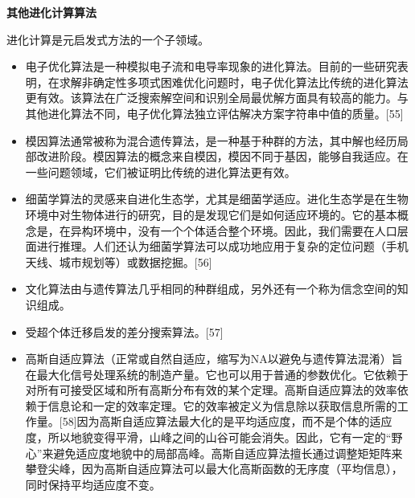 \textbf{其他进化计算算法}

进化计算是元启发式方法的一个子领域。
\begin{itemize}
\item 电子优化算法是一种模拟电子流和电导率现象的进化算法。目前的一些研究表明，在求解非确定性多项式困难优化问题时，电子优化算法比传统的进化算法更有效。该算法在广泛搜索解空间和识别全局最优解方面具有较高的能力。与其他进化算法不同，电子优化算法独立评估解决方案字符串中值的质量。[55]
\item 模因算法通常被称为混合遗传算法，是一种基于种群的方法，其中解也经历局部改进阶段。模因算法的概念来自模因，模因不同于基因，能够自我适应。在一些问题领域，它们被证明比传统的进化算法更有效。
\item 细菌学算法的灵感来自进化生态学，尤其是细菌学适应。进化生态学是在生物环境中对生物体进行的研究，目的是发现它们是如何适应环境的。它的基本概念是，在异构环境中，没有一个个体适合整个环境。因此，我们需要在人口层面进行推理。人们还认为细菌学算法可以成功地应用于复杂的定位问题（手机天线、城市规划等）或数据挖掘。[56]
\item 文化算法由与遗传算法几乎相同的种群组成，另外还有一个称为信念空间的知识组成。
\item 受超个体迁移启发的差分搜索算法。[57]
\item 高斯自适应算法（正常或自然自适应，缩写为NA以避免与遗传算法混淆）旨在最大化信号处理系统的制造产量。它也可以用于普通的参数优化。它依赖于对所有可接受区域和所有高斯分布有效的某个定理。高斯自适应算法的效率依赖于信息论和一定的效率定理。它的效率被定义为信息除以获取信息所需的工作量。[58]因为高斯自适应算法最大化的是平均适应度，而不是个体的适应度，所以地貌变得平滑，山峰之间的山谷可能会消失。因此，它有一定的“野心”来避免适应度地貌中的局部高峰。高斯自适应算法擅长通过调整矩矩阵来攀登尖峰，因为高斯自适应算法可以最大化高斯函数的无序度（平均信息），同时保持平均适应度不变。
\end{itemize}


